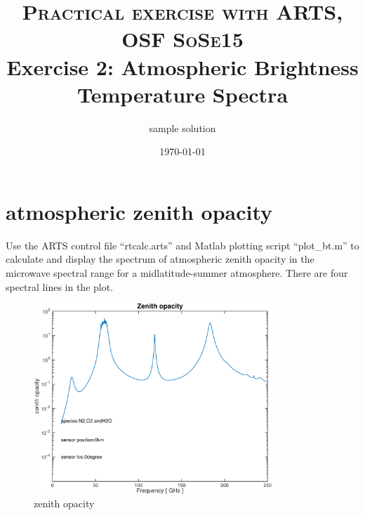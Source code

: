 \documentclass[paper=a4, fontsize=11pt]{scrartcl} %
\title{	
\normalfont \normalsize 
\textsc{Practical exercise with ARTS, OSF SoSe15} \\ [25pt] %
\huge Exercise 2: Atmospheric Brightness Temperature Spectra \\ %
}
\author{sample solution}
\date{\normalsize\today}
\begin{document}
\maketitle

\section{atmospheric zenith opacity}

Use the ARTS control file ``rtcalc.arts'' and Matlab plotting script ``plot\_bt.m'' to calculate and display the spectrum of atmospheric zenith opacity in the microwave spectral range for a midlatitude-summer atmosphere. There are four spectral lines in the plot. 

\begin{figure}[h!]
\centering
 \includegraphics[width=0.8\textwidth]{plots/opacity_N2+O2+H2O_0km_0deg.pdf}
 \caption{zenith opacity}
\end{figure}
\end{document}
